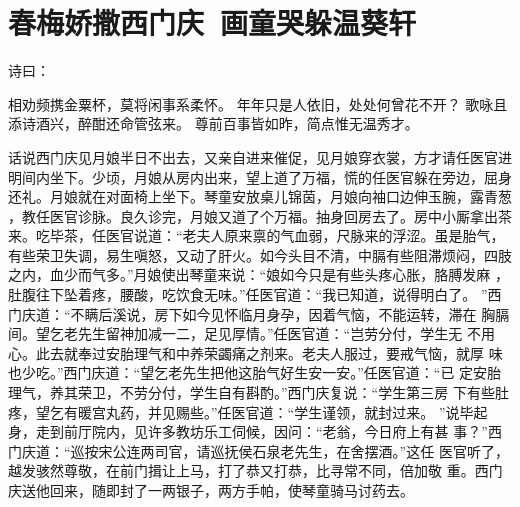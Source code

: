 \chapter{春梅娇撒西门庆~画童哭躲温葵轩}

诗曰：

相劝频携金粟杯，莫将闲事系柔怀。
年年只是人依旧，处处何曾花不开？
歌咏且添诗酒兴，醉酣还命管弦来。
尊前百事皆如昨，简点惟无温秀才。

话说西门庆见月娘半日不出去，又亲自进来催促，见月娘穿衣裳，方才请任医官进
明间内坐下。少顷，月娘从房内出来，望上道了万福，慌的任医官躲在旁边，屈身
还礼。月娘就在对面椅上坐下。琴童安放桌儿锦茵，月娘向袖口边伸玉腕，露青葱
，教任医官诊脉。良久诊完，月娘又道了个万福。抽身回房去了。房中小厮拿出茶
来。吃毕茶，任医官说道：“老夫人原来禀的气血弱，尺脉来的浮涩。虽是胎气，
有些荣卫失调，易生嗔怒，又动了肝火。如今头目不清，中膈有些阻滞烦闷，四肢
之内，血少而气多。”月娘使出琴童来说：“娘如今只是有些头疼心胀，胳膊发麻
，肚腹往下坠着疼，腰酸，吃饮食无味。”任医官道：“我已知道，说得明白了。
”西门庆道：“不瞒后溪说，房下如今见怀临月身孕，因着气恼，不能运转，滞在
胸膈间。望乞老先生留神加减一二，足见厚情。”任医官道：“岂劳分付，学生无
不用心。此去就奉过安胎理气和中养荣蠲痛之剂来。老夫人服过，要戒气恼，就厚
味也少吃。”西门庆道：“望乞老先生把他这胎气好生安一安。”任医官道：“已
定安胎理气，养其荣卫，不劳分付，学生自有斟酌。”西门庆复说：“学生第三房
下有些肚疼，望乞有暖宫丸药，并见赐些。”任医官道：“学生谨领，就封过来。
”说毕起身，走到前厅院内，见许多教坊乐工伺候，因问：“老翁，今日府上有甚
事？”西门庆道：“巡按宋公连两司官，请巡抚侯石泉老先生，在舍摆酒。”这任
医官听了，越发骇然尊敬，在前门揖让上马，打了恭又打恭，比寻常不同，倍加敬
重。西门庆送他回来，随即封了一两银子，两方手帕，使琴童骑马讨药去。

